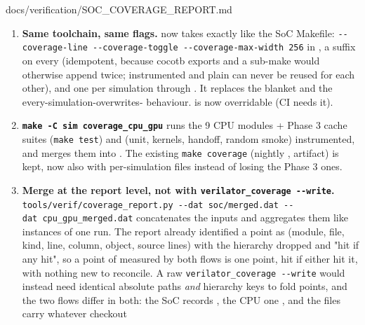 \begin{relocated}{docs/verification/SOC_COVERAGE_REPORT.md}
\begin{enumerate}
\def\labelenumi{\arabic{enumi}.}
\tightlist
\item
  \textbf{Same toolchain, same flags.}  now takes
   exactly like the SoC Makefile:
  \texttt{-\allowbreak{}-\allowbreak{}coverage-\allowbreak{}line\ -\allowbreak{}-\allowbreak{}coverage-\allowbreak{}toggle\ -\allowbreak{}-\allowbreak{}coverage-\allowbreak{}max-\allowbreak{}width\ 256}
  in , a  suffix on every 
  (idempotent, because cocotb exports  and a sub-make
  would otherwise append twice; instrumented and plain  can
  never be reused for each other), and one 
  per simulation through . It replaces
  the blanket  and the
  every-simulation-overwrites- behaviour.
   is now overridable (CI needs it).
\item
  \textbf{\texttt{make\ -\allowbreak{}C\ sim\ coverage\_\allowbreak{}cpu\_\allowbreak{}gpu}}
  runs the 9 CPU modules + Phase 3 cache suites (\texttt{make\ test})
  and  (unit, kernels, handoff, random smoke)
  instrumented, and merges them into . The
  existing \texttt{make\ coverage} (nightly ,
   artifact) is kept, now also with
  per-simulation  files instead of losing the Phase 3 ones.
\item
  \textbf{Merge at the report level, not with
  \texttt{verilator\_\allowbreak{}coverage\ -\allowbreak{}-\allowbreak{}write}.}
  \texttt{tools/\allowbreak{}verif/\allowbreak{}coverage\_\allowbreak{}report.\allowbreak{}py\ -\allowbreak{}-\allowbreak{}dat\ soc/\allowbreak{}merged.\allowbreak{}dat\ -\allowbreak{}-\allowbreak{}dat\ cpu\_\allowbreak{}gpu\_\allowbreak{}merged.\allowbreak{}dat}
  concatenates the inputs and aggregates them like instances of one run.
  The report already identified a point as (module, file, kind, line,
  column, object, source lines) with the hierarchy dropped and "hit if
  any hit", so a point of  measured by both flows is
  one point, hit if either hit it, with nothing new to reconcile. A raw
  \texttt{verilator\_\allowbreak{}coverage\ -\allowbreak{}-\allowbreak{}write}
  would instead need identical absolute paths \emph{and} hierarchy keys
  to fold points, and the two flows differ in both: the SoC 
  records , the CPU one
  , and the files carry whatever checkout

\end{enumerate}
\end{relocated}
